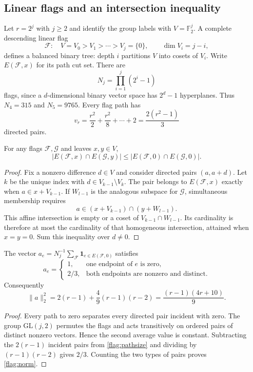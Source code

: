 \subsection{Linear flags and an intersection inequality}

Let $r=2^j$ with $j\ge2$ and identify the group labels with $V=\mathbb F_2^j$.
A complete descending linear flag
\[
 \mathcal F:\quad V=V_0>V_1>\cdots>V_j=\{0\},
 \qquad \dim V_i=j-i,
\]
defines a balanced binary tree: depth $i$ partitions $V$ into cosets of
$V_i$. Write $E(\mathcal F,x)$ for its path cut set. There are
\begin{equation}\label{flag:number}
 N_j=\prod_{i=1}^j(2^i-1)
\end{equation}
flags, since a $d$-dimensional binary vector space has $2^d-1$ hyperplanes.
Thus $N_4=315$ and $N_5=9765$. Every flag path has
\begin{equation}\label{flag:pathsize}
 v_r=\frac{r^2}{2}+\frac{r^2}{8}+\cdots+2
     =\frac{2(r^2-1)}3
\end{equation}
directed pairs.

\begin{lemma}\label{flag:intersection}
For any flags $\mathcal F,\mathcal G$ and leaves $x,y\in V$,
\[
 |E(\mathcal F,x)\cap E(\mathcal G,y)|
 \le |E(\mathcal F,0)\cap E(\mathcal G,0)|.
\]
\end{lemma}
\begin{proof}
Fix a nonzero difference $d\in V$ and consider directed pairs $(a,a+d)$.
Let $k$ be the unique index with $d\in V_{k-1}\setminus V_k$.
The pair belongs to $E(\mathcal F,x)$ exactly when
$a\in x+V_{k-1}$. If $W_{l-1}$ is the analogous subspace for
$\mathcal G$, simultaneous membership requires
\[
 a\in (x+V_{k-1})\cap(y+W_{l-1}).
\]
This affine intersection is empty or a coset of
$V_{k-1}\cap W_{l-1}$. Its cardinality is therefore at most the
cardinality of that homogeneous intersection, attained when $x=y=0$.
Sum this inequality over $d\ne0$.
\end{proof}

\begin{lemma}\label{flag:average}
The vector
$a_e=N_j^{-1}\sum_{\mathcal F}\mathbf1_{e\in E(\mathcal F,0)}$
satisfies
\[
 a_e=\begin{cases}
 1,&\text{one endpoint of $e$ is zero},\\
 2/3,&\text{both endpoints are nonzero and distinct}.
 \end{cases}
\]
Consequently
\begin{equation}\label{flag:norm}
 \|a\|_2^2
 =2(r-1)+\frac49(r-1)(r-2)
 =\frac{(r-1)(4r+10)}9.
\end{equation}
\end{lemma}
\begin{proof}
Every path to zero separates every directed pair incident with zero.
The group $\mathrm{GL}(j,2)$ permutes the flags and acts transitively on
ordered pairs of distinct nonzero vectors. Hence the second average value
is constant. Subtracting the $2(r-1)$ incident pairs from
\eqref{flag:pathsize} and dividing by $(r-1)(r-2)$ gives $2/3$.
Counting the two types of pairs proves \eqref{flag:norm}.
\end{proof}

